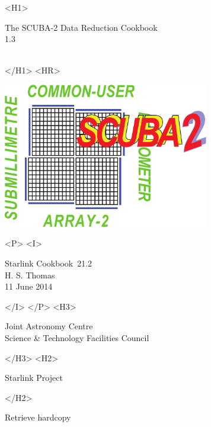 \documentclass[twoside,11pt]{article}
\newcommand{\stardoccategory}  {Starlink Cookbook}
\newcommand{\stardocsource}    {sc\stardocnumber}
\newcommand{\stardocnumber}    {21.2}
\newcommand{\stardocauthors}   {H. S. Thomas}
\newcommand{\stardocdate}      {11 June 2014}
\newcommand{\stardoctitle}     {The SCUBA-2 Data Reduction Cookbook}
\newcommand{\stardocversion}   {1.3}
\newcommand{\stardocmanual}    {\ }
\newcommand{\htmladdnormallink}[2]{#1}
\newcommand{\htmladdimg}[1]{}
\newcommand{\xlabel}[1]{}
\renewcommand{\_}{\texttt{\symbol{95}}}
\begin{document}
\begin{htmlonly}
   \xlabel{}
   \begin{rawhtml} <H1> \end{rawhtml}
      \stardoctitle\\
      \stardocversion\\
      \stardocmanual
   \begin{rawhtml} </H1> <HR> \end{rawhtml}

   \includegraphics[width=90mm]{sc21_s2logo}

   \begin{rawhtml} <P> <I> \end{rawhtml}
   \stardoccategory\ \stardocnumber \\
   \stardocauthors \\
   \stardocdate
   \begin{rawhtml} </I> </P> <H3> \end{rawhtml}
      \htmladdnormallink{Joint Astronomy Centre}
                        {http://www.jach.hawaii.edu}\\
      \htmladdnormallink{Science \& Technology Facilities Council}
                        {http://www.scitech.ac.uk} \\
   \begin{rawhtml} </H3> <H2> \end{rawhtml}
      \htmladdnormallink{Starlink Project}{http://www.starlink.ac.uk/}
   \begin{rawhtml} </H2> \end{rawhtml}
   \htmladdnormallink{\htmladdimg{source.gif} Retrieve hardcopy}
      {http://www.starlink.ac.uk/cgi-bin/hcserver?\stardocsource}\\


\end{htmlonly}
\end{document}
